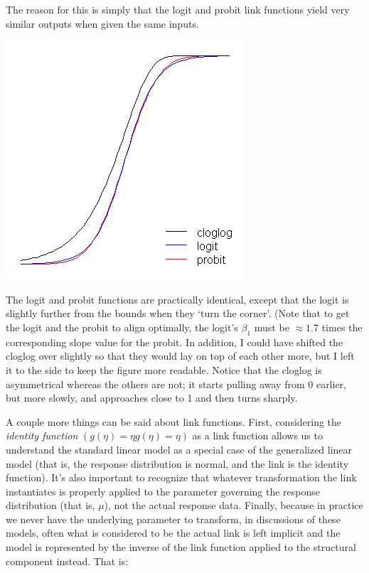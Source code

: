 \documentclass[
]{book}
\begin{document}
The reason for this is simply that the logit and probit link functions
yield very similar outputs when given the same inputs.

\includegraphics{fig/glmm_probit_StackOverflow.png}

The logit and probit functions are practically identical,
except that the logit is slightly further from the bounds when they `turn the corner'.
(Note that to get the logit and the probit to align optimally,
the logit's \(β_1\) must be \(≈1.7\) times the corresponding slope value for the probit.
In addition, I could have shifted the cloglog over slightly
so that they would lay on top of each other more,
but I left it to the side to keep the figure more readable.
Notice that the cloglog is asymmetrical whereas the others are not;
it starts pulling away from 0 earlier, but more slowly,
and approaches close to 1 and then turns sharply.

A couple more things can be said about link functions.
First, considering the \emph{identity function} \((g(η)=ηg(\eta)=\eta)\)
as a link function allows us to understand the standard linear model
as a special case of the generalized linear model
(that is, the response distribution is normal, and the link is the identity function).
It's also important to recognize that whatever transformation the link instantiates
is properly applied to the parameter governing the response distribution (that is, \(μ\)),
not the actual response data.
Finally, because in practice we never have the underlying parameter to transform,
in discussions of these models,
often what is considered to be the actual link is left implicit and
the model is represented by the inverse of the link function
applied to the structural component instead.
That is:
\end{document}
